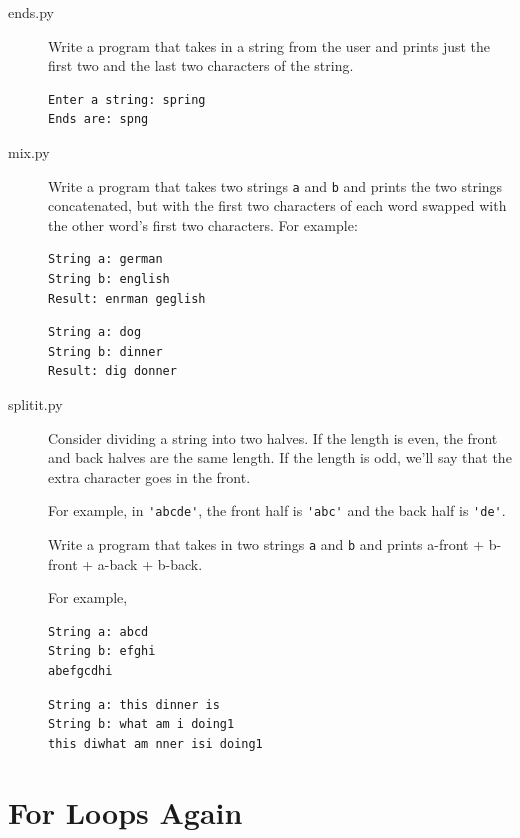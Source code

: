 \documentclass[11pt]{cselabheader}
\begin{document}
\begin{description}
  \item[ends.py] Write a program that takes in a string from the user and prints
    just the first two and the last two characters of the string.

    \begin{lstlisting}[style=bash]
Enter a string: spring
Ends are: spng
    \end{lstlisting}

  \item[mix.py] Write a program that takes two strings
    \lstinline!a! and \lstinline!b! and prints the two strings concatenated, but
    with the first two characters of each word swapped with the other word's
    first two characters. For example:

    \begin{lstlisting}[style=bash]
String a: german
String b: english
Result: enrman geglish
    \end{lstlisting}

    \begin{lstlisting}[style=bash]
String a: dog
String b: dinner
Result: dig donner
    \end{lstlisting}

  \item[splitit.py] Consider dividing a string into two halves. If the length is
    even, the front and back halves are the same length. If the length is odd,
    we'll say that the extra character goes in the front. 

    For example, in \lstinline!'abcde'!, the front half is \lstinline!'abc'! and
    the back half is \lstinline!'de'!. 

    Write a program that takes in two strings \lstinline!a! and \lstinline!b!
    and prints a-front + b-front + a-back + b-back.

    For example,
    \begin{lstlisting}[style=bash]
String a: abcd
String b: efghi
abefgcdhi
    \end{lstlisting}
    \begin{lstlisting}[style=bash]
String a: this dinner is
String b: what am i doing1
this diwhat am nner isi doing1
    \end{lstlisting}
\end{description}

\pagebreak
\section{For Loops Again}
\end{document}

